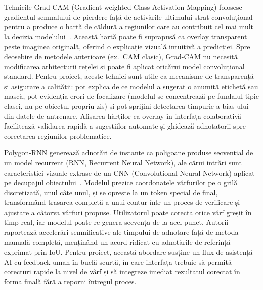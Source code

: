 Tehnicile Grad-CAM (Gradient-weighted Class Activation Mapping) folosesc gradientul semnalului de pierdere față de activările ultimului strat convoluțional pentru a produce o hartă de căldură a regiunilor care au contribuit cel mai mult la decizia modelului~\cite{Selvaraju_2019}. Această hartă poate fi suprapusă ca overlay transparent peste imaginea originală, oferind o explicație vizuală intuitivă a predicției. Spre deosebire de metodele anterioare (ex.\ CAM clasic), Grad-CAM nu necesită modificarea arhitecturii rețelei și poate fi aplicat oricărui model convoluțional standard. Pentru proiect, aceste tehnici sunt utile ca mecanisme de transparență și asigurare a calității: pot explica de ce modelul a sugerat o anumită etichetă sau mască, pot evidenția erori de focalizare (modelul se concentrează pe fundalul tipic clasei, nu pe obiectul propriu-zis) și pot sprijini detectarea timpurie a bias-ului din datele de antrenare. Afișarea hărților ca overlay în interfața colaborativă facilitează validarea rapidă a sugestiilor automate și ghidează adnotatorii spre corectarea regiunilor problematice.

Polygon-RNN generează adnotări de instanțe ca poligoane produse secvențial de un model recurrent (RNN, Recurrent Neural Network), ale cărui intrări sunt caracteristici vizuale extrase de un CNN (Convolutional Neural Network) aplicat pe decupajul obiectului~\cite{castrejon2017annotatingobjectinstancespolygonrnn}. Modelul prezice coordonatele vârfurilor pe o grilă discretizată, unul câte unul, și se oprește la un token special de final, transformând trasarea completă a unui contur într-un proces de verificare și ajustare a câtorva vârfuri propuse. Utilizatorul poate corecta orice vârf greșit în timp real, iar modelul poate re-genera secvența de la acel punct. Autorii raportează accelerări semnificative ale timpului de adnotare față de metoda manuală completă, menținând un acord ridicat cu adnotările de referință exprimat prin IoU. Pentru proiect, această abordare susține un flux de asistență AI cu feedback uman în buclă scurtă, în care interfața trebuie să permită corecturi rapide la nivel de vârf și să integreze imediat rezultatul corectat în forma finală fără a reporni întregul proces.

